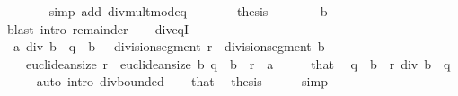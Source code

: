 \begin{isabellebody}
\ \ \ \ \ \ \isamarkupfalse%
\ {\isacharparenleft}{\kern0pt}simp\ add{\isacharcolon}{\kern0pt}\ div{\isacharunderscore}{\kern0pt}mult{\isacharunderscore}{\kern0pt}mod{\isacharunderscore}{\kern0pt}eq{\isacharparenright}{\kern0pt}\isanewline
\ \ \ \ \isamarkupfalse%
\ \isamarkupfalse%
\ thesis\isanewline
\ \ \ \ \ \ \isamarkupfalse%
\ {\isacartoucheopen}b\ {\isasymnoteq}\ {}{\isacartoucheclose}\ \isamarkupfalse%
\ {\isacharparenleft}{\kern0pt}blast\ intro{\isacharbang}{\kern0pt}{\isacharcolon}{\kern0pt}\ remainder{\isacharparenright}{\kern0pt}\isanewline
\ \ \isamarkupfalse%
\isanewline
{}\isamarkupfalse%
%
\endisatagproof
{\isafoldproof}%
%
\isadelimproof
\isanewline
%
\endisadelimproof
\isanewline
{}\isamarkupfalse%
\ div{\isacharunderscore}{\kern0pt}eqI{\isacharcolon}{\kern0pt}\isanewline
\ \ {\isachardoublequoteopen}a\ div\ b\ {\isacharequal}{\kern0pt}\ q{\isachardoublequoteclose}\ \ {\isachardoublequoteopen}b\ {\isasymnoteq}\ {}{\isachardoublequoteclose}\ {\isachardoublequoteopen}division{\isacharunderscore}{\kern0pt}segment\ r\ {\isacharequal}{\kern0pt}\ division{\isacharunderscore}{\kern0pt}segment\ b{\isachardoublequoteclose}\isanewline
\ \ \ \ {\isachardoublequoteopen}euclidean{\isacharunderscore}{\kern0pt}size\ r\ {\isacharless}{\kern0pt}\ euclidean{\isacharunderscore}{\kern0pt}size\ b{\isachardoublequoteclose}\ {\isachardoublequoteopen}q\ {\isacharasterisk}{\kern0pt}\ b\ {\isacharplus}{\kern0pt}\ r\ {\isacharequal}{\kern0pt}\ a{\isachardoublequoteclose}\isanewline
%
\isadelimproof
%
\endisadelimproof
%
\isatagproof
{}\isamarkupfalse%
\ {\isacharminus}{\kern0pt}\isanewline
\ \ \isamarkupfalse%
\ that\ \isamarkupfalse%
\ {\isachardoublequoteopen}{\isacharparenleft}{\kern0pt}q\ {\isacharasterisk}{\kern0pt}\ b\ {\isacharplus}{\kern0pt}\ r{\isacharparenright}{\kern0pt}\ div\ b\ {\isacharequal}{\kern0pt}\ q{\isachardoublequoteclose}\isanewline
\ \ \ \ \isamarkupfalse%
\ {\isacharparenleft}{\kern0pt}auto\ intro{\isacharcolon}{\kern0pt}\ div{\isacharunderscore}{\kern0pt}bounded{\isacharparenright}{\kern0pt}\isanewline
\ \ \isamarkupfalse%
\ that\ \isamarkupfalse%
\ {\isacharquery}{\kern0pt}thesis\isanewline
\ \ \ \ \isamarkupfalse%
\ simp\isanewline
{}\isamarkupfalse%
%
\endisatagproof
{\isafoldproof}%
%
\isadelimproof
\isanewline
%
\endisadelimproof
\isanewline

\end{isabellebody}
